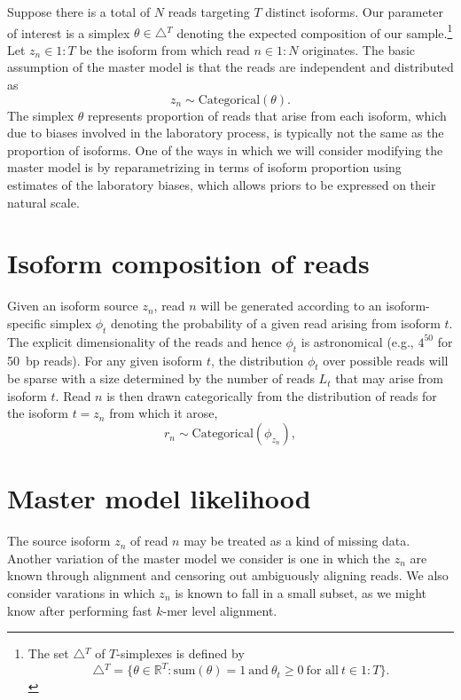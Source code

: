 \documentclass[11pt]{report}
\newcommand{\rngto}[1]{1{:}#1}
\begin{document}
Suppose there is a total of $N$ reads targeting $T$ distinct isoforms.
Our parameter of interest is a simplex $\theta \in \bigtriangleup\!^T$
denoting the expected composition of our sample.\footnote{The set
  $\bigtriangleup\!^T$ of $T$-simplexes is defined by
  \[
    \bigtriangleup\!^T
    = \{ \theta \in \mathbb{R}^T : 
    \textrm{sum}(\theta) = 1
    \ \textrm{and} \
    \theta_t \geq 0 \ \textrm{for all} \ t \in \rngto{T}
    \}.
  \]
}
Let
$z_n \in \rngto{T}$ be the isoform from which read $n \in \rngto{N}$
originates. The basic assumption of the master model is that the reads
are independent and distributed as
\[
  z_n \sim \textrm{Categorical}(\theta).
\]
The simplex $\theta$ represents proportion of reads that arise from
each isoform, which due to biases involved in the laboratory process,
is typically not the same as the proportion of isoforms.  One of the
ways in which we will consider modifying the master model is by
reparametrizing in terms of isoform proportion using estimates of the
laboratory biases, which allows priors to be expressed on their
natural scale.

\section{Isoform composition of reads}

Given an isoform source $z_n$, read $n$ will be generated according to
an isoform-specific simplex $\phi_t$ denoting the probability of a
given read arising from isoform $t$.  The explicit dimensionality of
the reads and hence $\phi_t$ is astronomical (e.g., $4^{50}$ for 50~bp
reads).  For any given isoform $t$, the distribution $\phi_t$ over
possible reads will be sparse with a size determined by the number of
reads $L_t$ that may arise from isoform $t$.  Read $n$ is then drawn
categorically from the distribution of reads for the isoform $t = z_n$
from which it arose,
\[
  r_n \sim \textrm{Categorical}(\phi_{z_n}), 
\]

\section{Master model likelihood}

The source isoform $z_n$ of read $n$ may be treated as a kind of
missing data.  Another variation of the master model we consider is
one in which the $z_n$ are known through alignment and censoring out
ambiguously aligning reads.  We also consider varations in which $z_n$
is known to fall in a small subset, as we might know after performing
fast $k$-mer level alignment.
\end{document}
